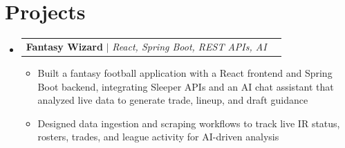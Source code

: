 \documentclass[letterpaper,11pt]{article}
\makeatletter
\newcommand{\resumeItem}[1]{
  \item\small{
    {#1 \vspace{-1pt}}
  }
}
\newcommand{\resumeProjectHeading}[2]{
    \item
    \begin{tabular*}{0.97\textwidth}{l@{\extracolsep{\fill}}r}
      \small#1 & #2 \\
    \end{tabular*}\vspace{-7pt}
}
\newcommand{\resumeSubHeadingListStart}{\begin{itemize}[leftmargin=0.15in, label={}]}
\newcommand{\resumeSubHeadingListEnd}{\end{itemize}}
\newcommand{\resumeItemListStart}{\begin{itemize}[leftmargin=0.18in,itemsep=1pt,topsep=2pt]}
\newcommand{\resumeItemListEnd}{\end{itemize}\vspace{-5pt}}
\makeatother
\begin{document}
%
\section{Projects}
    \resumeSubHeadingListStart
      \resumeProjectHeading
          {\textbf{Fantasy Wizard} $|$ \emph{React, Spring Boot, REST APIs, AI}}{}
          \resumeItemListStart
            \resumeItem{Built a fantasy football application with a React frontend and Spring Boot backend, integrating Sleeper APIs and an AI chat assistant that analyzed live data to generate trade, lineup, and draft guidance}
            \resumeItem{Designed data ingestion and scraping workflows to track live IR status, rosters, trades, and league activity for AI-driven analysis}
          \resumeItemListEnd
    \resumeSubHeadingListEnd

\end{document}
